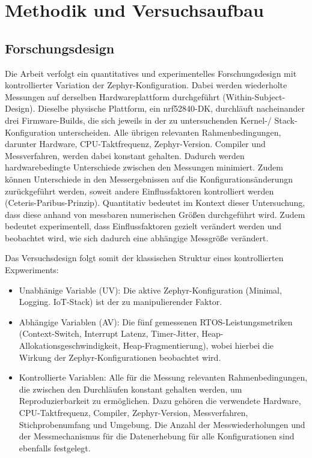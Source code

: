 
\chapter{Methodik und Versuchsaufbau}
\label{ch:methodik}

\section{Forschungsdesign}

Die Arbeit verfolgt ein quantitatives und experimentelles Forschungsdesign mit kontrollierter Variation der Zephyr-Konfiguration. Dabei werden wiederholte Messungen auf derselben Hardwareplattform durchgeführt (Within-Subject-Design). Dieselbe physische Plattform, ein nrf52840-DK, durchläuft nacheinander drei Firmware-Builds, die sich jeweils in der zu untersuchenden Kernel-/ Stack-Konfiguration unterscheiden. Alle übrigen relevanten Rahmenbedingungen, darunter Hardware, CPU-Taktfrequenz, Zephyr-Version. Compiler und Messverfahren, werden dabei konstant gehalten. Dadurch werden hardwarebedingte Unterschiede zwischen den Messungen minimiert. Zudem können Unterschiede in den Messergebnissen auf die Konfigurationsänderungn zurückgeführt werden, soweit andere Einflussfaktoren kontrolliert werden (Ceteris-Paribus-Prinzip). Quantitativ bedeutet im Kontext dieser Untersuchung, dass diese anhand von messbaren numerischen Größen durchgeführt wird. Zudem bedeutet experimentell, dass Einflussfaktoren gezielt verändert werden und beobachtet wird, wie sich dadurch eine abhängige Messgröße verändert.

Das Versuchsdesign folgt somit der klassischen Struktur eines kontrollierten Expweriments:

\begin{itemize}
\item Unabhänige Variable (UV): Die aktive Zephyr-Konfiguration (Minimal, Logging. IoT-Stack) ist der zu manipulierender Faktor.
\item Abhängige Variablen (AV): Die fünf gemessenen RTOS-Leistungsmetriken (Context-Switch, Interrupt Latenz, Timer-Jitter, Heap-Allokationsgeschwindigkeit, Heap-Fragmentierung), wobei hierbei die Wirkung der Zephyr-Konfigurationen beobachtet wird.
\item Kontrollierte Variablen: Alle für die Messung relevanten Rahmenbedingungen, die zwischen den Durchläufen konstant gehalten werden, um Reproduzierbarkeit zu ermöglichen. Dazu gehören die verwendete Hardware, CPU-Taktfrequenz, Compiler, Zephyr-Version, Messverfahren, Stichprobenumfang und Umgebung. Die Anzahl der Messwiederholungen und der Messmechanismus für die Datenerhebung für alle Konfigurationen sind ebenfalls festgelegt.
\end{itemize}

